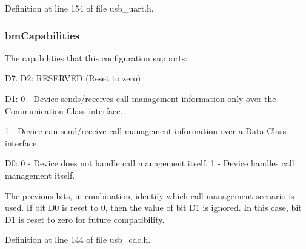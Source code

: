 Definition at line 154 of file usb\-\_\-uart.\-h.

\hypertarget{struct_u_s_b___call___management___functional___descriptor_a9ad7ca27543639baeed1b53c6f24e149}{
\subsubsection[{bm\-Capabilities}]{ bm\-Capabilities}}\label{struct_u_s_b___call___management___functional___descriptor_a9ad7ca27543639baeed1b53c6f24e149}
The capabilities that this configuration supports\-:
\begin{DoxyItemize}
\item D7..D2\-: R\-E\-S\-E\-R\-V\-E\-D (Reset to zero)
\item D1\-: 0 -\/ Device sends/receives call management information only over the Communication Class interface.\par
1 -\/ Device can send/receive call management information over a Data Class interface.
\item D0\-: 0 -\/ Device does not handle call management itself. 1 -\/ Device handles call management itself.
\end{DoxyItemize}The previous bits, in combination, identify which call management scenario is used. If bit D0 is reset to 0, then the value of bit D1 is ignored. In this case, bit D1 is reset to zero for future compatibility. 

Definition at line 144 of file usb\-\_\-cdc.\-h.

